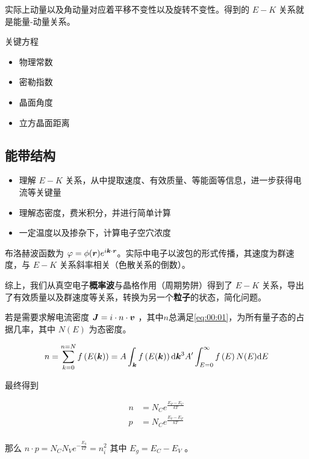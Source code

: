\documentclass[cn,11pt,chinese,black,simple]{../elegantbook}
\begin{document}
实际上动量以及角动量对应着平移不变性以及旋转不变性。得到的 \(E-K\) 关系就是能量-动量关系。

{关键方程}

\begin{itemize}
    \item 物理常数
    \item 密勒指数
    \item 晶面角度
    \item 立方晶面距离
\end{itemize}

\subsection{能带结构}

\begin{itemize}
    \item 理解 \(E-K\) 关系，从中提取速度、有效质量、等能面等信息，进一步获得电流等关键量
    \item 理解态密度，费米积分，并进行简单计算
    \item 一定温度以及掺杂下，计算电子空穴浓度
\end{itemize}

布洛赫波函数为 \(\varphi = \phi (\boldsymbol{r}) e^{i \boldsymbol{k} \cdot \boldsymbol{r}}\)。实际中电子以波包的形式传播，其速度为群速度，与 \(E-K\) 关系斜率相关（色散关系的倒数）。

综上，我们从真空电子\textbf{概率波}与晶格作用（周期势阱）得到了 \(E-K\) 关系，导出了有效质量以及群速度等关系，转换为另一个\textbf{粒子}的状态，简化问题。

若是需要求解电流密度 \(\boldsymbol{J} = i \cdot n \cdot \boldsymbol{v}\) ，其中\(n\)总满足\eqref{eq:00:01}，为所有量子态的占据几率，其中 \(N(E)\) 为态密度。

\begin{equation}\label{eq:00:01}
    n = \displaystyle\sum_{k = 0}^{n = N} f\left(E(\boldsymbol{k})\right) = A \int_{\boldsymbol{k}} f\left(E(\boldsymbol{k})\right) \mathrm{d}\boldsymbol{k}^3 A' \int_{E=0}^\infty f\left(E\right) N(E) \mathrm{d}E 
\end{equation}

最终得到

\[
\begin{aligned}
    n &= N_C e^{\frac{E_F-E_C}{k T}} \\
    p &= N_C e^{\frac{E_V-E_F}{k T}} \\
\end{aligned}
\]

那么 \(n \cdot p = N_C N_V e^{-\frac{E_g}{k T}} = n_i^2\) 其中 \(E_g = E_C - E_V\) 。
\end{document}
